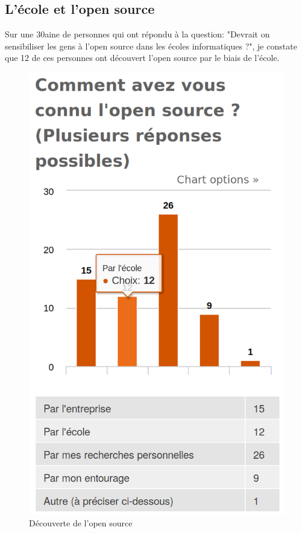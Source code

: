 		\subsection{L'école et l'open source}

			Sur une 30aine de personnes qui ont répondu à la question: "Devrait on sensibiliser les gens à l'open source dans les écoles informatiques ?", je constate que 12 de ces personnes ont découvert l'open source par le biais de l'école.

			\begin{figure}[ht]
				\center
				\includegraphics[scale=0.28]{./img/a3}
				\caption{Découverte de l'open source}
			\end{figure}


